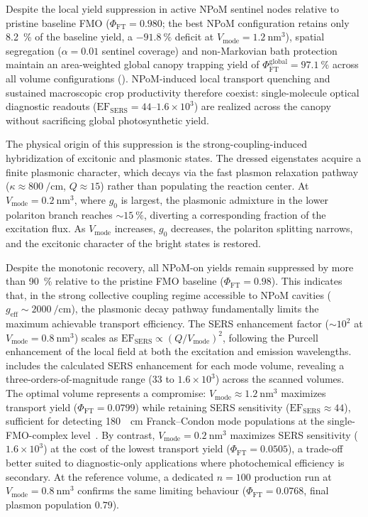 \documentclass[12pt]{iopart}
\begin{document}
Despite the local yield suppression in active NPoM sentinel nodes relative to pristine baseline FMO ($\Phi_{\mathrm{FT}} = 0.980$; the best NPoM configuration retains only \qty{8.2}{\percent} of the baseline yield, a $\qty{-91.8}{\percent}$ deficit at $V_{\mathrm{mode}} = \qty{1.2}{\nm\cubed}$), spatial segregation ($\alpha = 0.01$ sentinel coverage) and non-Markovian bath protection maintain an area-weighted global canopy trapping yield of $\Phi_{\mathrm{FT}}^{\mathrm{global}} = \qty{97.1}{\percent}$ across all volume configurations (). NPoM-induced local transport quenching and sustained macroscopic crop productivity therefore coexist: single-molecule optical diagnostic readouts ($\mathrm{EF}_{\mathrm{SERS}} = 44$--$1.6\times 10^3$) are realized across the canopy without sacrificing global photosynthetic yield.

The physical origin of this suppression is the strong-coupling-induced hybridization of excitonic and plasmonic states.
The dressed eigenstates acquire a finite plasmonic character, which decays via the fast plasmon relaxation pathway ($\kappa \approx \qty{800}{\per\cm}$, $Q \approx 15$) rather than populating the reaction center.
At $V_{\mathrm{mode}} = \qty{0.2}{\nm\cubed}$, where $g_0$ is largest, the plasmonic admixture in the lower polariton branch reaches $\sim \qty{15}{\percent}$, diverting a corresponding fraction of the excitation flux.
As $V_{\mathrm{mode}}$ increases, $g_0$ decreases, the polariton splitting narrows, and the excitonic character of the bright states is restored.

Despite the monotonic recovery, all NPoM-on yields remain suppressed by more than \qty{90}{\percent} relative to the pristine FMO baseline ($\Phi_{\mathrm{FT}} = 0.98$).
This indicates that, in the strong collective coupling regime accessible to NPoM cavities ($g_{\mathrm{eff}} \sim \qty{2000}{\per\cm}$), the plasmonic decay pathway fundamentally limits the maximum achievable transport efficiency.
The SERS enhancement factor ($\sim 10^2$ at $V_{\mathrm{mode}} = \qty{0.8}{\nm\cubed}$) scales as $\mathrm{EF}_{\mathrm{SERS}} \propto (Q/V_{\mathrm{mode}})^2$, following the Purcell enhancement of the local field at both the excitation and emission wavelengths.
 includes the calculated SERS enhancement for each mode volume, revealing a three-orders-of-magnitude range ($33$ to $1.6\times10^3$) across the scanned volumes. The optimal volume represents a compromise: $V_{\mathrm{mode}} \approx \qty{1.2}{\nm\cubed}$ maximizes transport yield ($\Phi_{\mathrm{FT}} = 0.0799$) while retaining SERS sensitivity ($\mathrm{EF}_{\mathrm{SERS}} \approx 44$), sufficient for detecting \qty{180}{\per\cm} Franck--Condon mode populations at the single-FMO-complex level~\cite{CiallaMay2024}.
By contrast, $V_{\mathrm{mode}} = \qty{0.2}{\nm\cubed}$ maximizes SERS sensitivity ($1.6\times10^3$) at the cost of the lowest transport yield ($\Phi_{\mathrm{FT}} = 0.0505$), a trade-off better suited to diagnostic-only applications where photochemical efficiency is secondary. At the reference volume, a dedicated $n=100$ production run at $V_{\mathrm{mode}} = \qty{0.8}{\nm\cubed}$ confirms the same limiting behaviour ($\Phi_{\mathrm{FT}} = 0.0768$, final plasmon population $0.79$).
\end{document}
